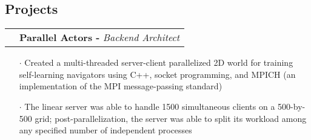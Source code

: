 \documentclass[a4paper, oneside, final]{scrartcl} %
\newcommand{\gray}{\rowcolor[gray]{.90}} %
\begin{document}
\begin{center}
\section{Projects}
\renewcommand{\arraystretch}{1.3}






\vspace{-0.05cm}

\begin{tabularx}{1.00\linewidth}{>{\raggedleft\scshape}p{0cm}X}
\gray & \textbf{Parallel Actors -} \textit{Backend Architect}\\
\end{tabularx}
\begin{itemize}\itemsep-0.2cm
\vspace{-0.1cm}
\item[$\cdot$] Created a multi-threaded server-client parallelized 2D world for training self-learning navigators using C++, socket programming, and MPICH (an implementation of the MPI message-passing standard) \\
\item[$\cdot$] The linear server was able to handle 1500 simultaneous clients on a 500-by-500 grid; post-parallelization, the server was able to split its workload among any specified number of independent processes \\
\end{itemize}


\end{center}
\end{document}
